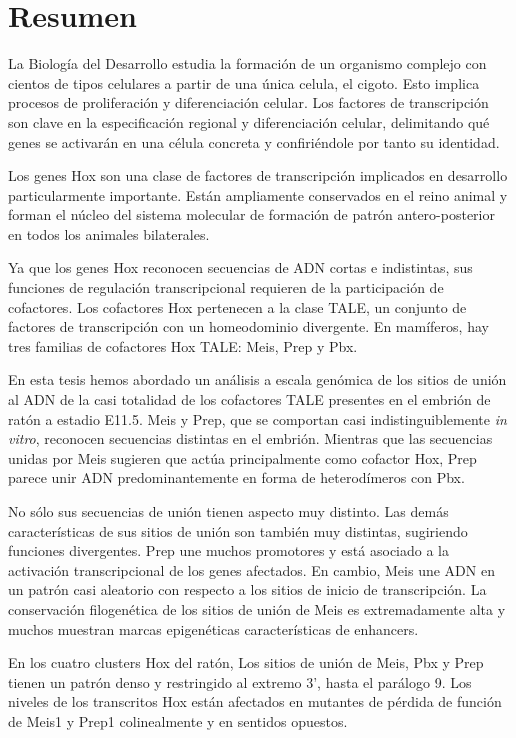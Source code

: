 
\chapter{Resumen}
\restorepagenumber

La Biología del Desarrollo estudia la formación de un organismo complejo con cientos de tipos celulares a partir de una única celula, el cigoto. Esto implica procesos de proliferación y diferenciación celular. Los factores de transcripción son clave en la especificación regional y diferenciación celular, delimitando qué genes se activarán en una célula concreta y confiriéndole por tanto su identidad. 

Los genes Hox son una clase de factores de transcripción implicados en desarrollo particularmente importante. Están ampliamente conservados en el reino animal y forman el núcleo del sistema molecular de formación de patrón antero-posterior en todos los animales bilaterales. 

Ya que los genes Hox reconocen secuencias de ADN cortas e indistintas, sus funciones de regulación transcripcional requieren de la participación de cofactores. Los cofactores Hox pertenecen a la clase TALE, un conjunto de factores de transcripción con un homeodominio divergente. En mamíferos, hay tres familias de cofactores Hox TALE: Meis, Prep y Pbx. 

En esta tesis hemos abordado un análisis a escala genómica de los sitios de unión al ADN de la casi totalidad de los cofactores TALE presentes en el embrión de ratón a estadio E11.5. Meis y Prep, que se comportan casi indistinguiblemente \textit{in vitro}, reconocen secuencias distintas en el embrión. Mientras que las secuencias unidas por Meis sugieren que actúa principalmente como cofactor Hox, Prep parece unir ADN predominantemente en forma de heterodímeros con Pbx. 

No sólo sus secuencias de unión tienen aspecto muy distinto. Las demás características de sus sitios de unión son también muy distintas, sugiriendo funciones divergentes. Prep une muchos promotores y está asociado a la activación transcripcional de los genes afectados. En cambio, Meis une ADN en un patrón casi aleatorio con respecto a los sitios de inicio de transcripción. La conservación filogenética de los sitios de unión de Meis es extremadamente alta y muchos muestran marcas epigenéticas características de enhancers. 

En los cuatro clusters Hox del ratón, Los sitios de unión de Meis, Pbx y Prep tienen un patrón denso y restringido al extremo 3', hasta el parálogo 9. Los niveles de los transcritos Hox están afectados en mutantes de pérdida de función de Meis1 y Prep1 colinealmente y en sentidos opuestos.

